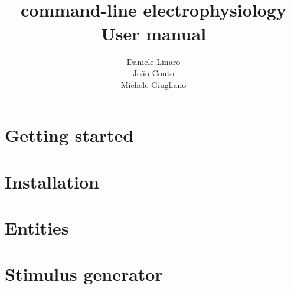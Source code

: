 \documentclass[10pt,a4paper,twoside]{book}
\title{\textbf{\progname} \\ command-line electrophysiology \\ User manual}
\author{Daniele Linaro \\ Jo\~ao Couto \\ Michele Giugliano}
\date{}
\begin{document}
\maketitle
\thispagestyle{empty}

\tableofcontents
\newpage
{}
\chapter{Getting started}
\label{chapter:start}



\chapter{Installation}
\label{chapter:install}


\chapter{Entities}
\label{chapter:entities}

\chapter{Stimulus generator}
\label{chapter:stimgen}
\end{document}
